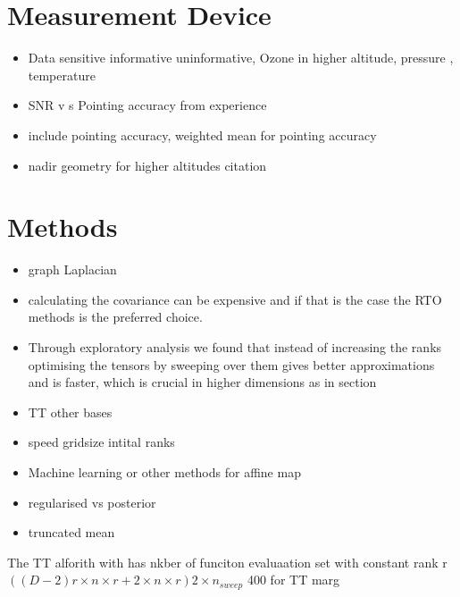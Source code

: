 \section{Measurement Device}
\begin{itemize}
	\item Data sensitive informative uninformative, Ozone in higher altitude, pressure , temperature
	\item SNR v s Pointing accuracy from experience
	\item include pointing accuracy, weighted mean for pointing accuracy
	\item nadir geometry for higher altitudes citation
\end{itemize}

\section{Methods}
\begin{itemize}
	\item graph Laplacian
	\item calculating the covariance can be expensive and if that is the case the RTO methods is the preferred choice.
	\item Through exploratory analysis we found that instead of increasing the ranks optimising the tensors by sweeping over them gives better approximations and is faster, which is crucial in higher dimensions as in section
	\item TT other bases
	\item speed gridsize intital ranks
	\item Machine learning or other methods for affine map
	\item regularised vs posterior
	\item truncated mean
\end{itemize}

The TT alforith with has nkber of funciton evaluaation set with constant rank r 
$( (D-2) r \times n\times r + 2  \times n \times r)2 \times n_{sweep}$
400 for TT marg